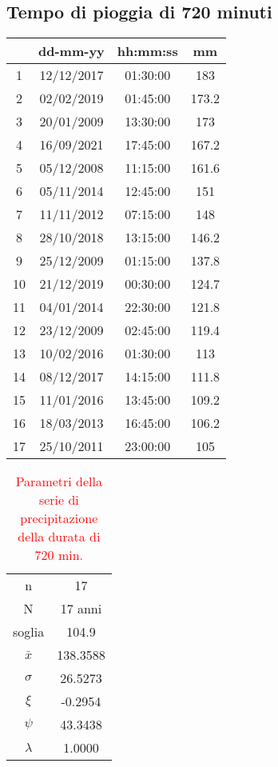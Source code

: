 \subsection{Tempo di pioggia di 720 minuti}
\begin{table}[H] \centering
    \begin{tabular}{cccc}
    \toprule
       & dd-mm-yy   & hh:mm:ss & mm  \\
    \midrule
    1  & 12/12/2017 & 01:30:00 & 183   \\
    2  & 02/02/2019 & 01:45:00 & 173.2 \\
    3  & 20/01/2009 & 13:30:00 & 173   \\
    4  & 16/09/2021 & 17:45:00 & 167.2 \\
    5  & 05/12/2008 & 11:15:00 & 161.6 \\
    6  & 05/11/2014 & 12:45:00 & 151   \\
    7  & 11/11/2012 & 07:15:00 & 148   \\
    8  & 28/10/2018 & 13:15:00 & 146.2 \\
    9  & 25/12/2009 & 01:15:00 & 137.8 \\
    10 & 21/12/2019 & 00:30:00 & 124.7 \\
    11 & 04/01/2014 & 22:30:00 & 121.8 \\
    12 & 23/12/2009 & 02:45:00 & 119.4 \\
    13 & 10/02/2016 & 01:30:00 & 113   \\
    14 & 08/12/2017 & 14:15:00 & 111.8 \\
    15 & 11/01/2016 & 13:45:00 & 109.2 \\
    16 & 18/03/2013 & 16:45:00 & 106.2 \\
    17 & 25/10/2011 & 23:00:00 & 105   \\
    \bottomrule
    \end{tabular}
    \end{table}

    \begin{table}[H] \centering
        \caption{\textcolor{red}{Parametri della serie di precipitazione della durata di 720 min.}}
        \begin{tabular}{cc}
            \toprule
        n        &   17      \\
        N        & 17 anni \\
        soglia   &     104.9    \\
        $\bar{x}$ &    138.3588    \\
        $\sigma$ &      26.5273   \\
        $\xi$      &     -0.2954  \\
        $\psi$      &    43.3438 \\
        $\lambda$   &   1.0000 \\
    \bottomrule    
    \end{tabular}
        \end{table}

